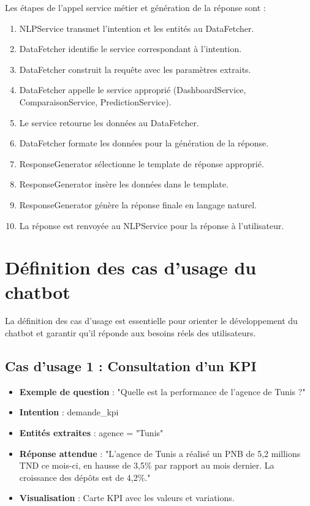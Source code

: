 Les étapes de l'appel service métier et génération de la réponse sont :

\begin{enumerate}
    \item NLPService transmet l'intention et les entités au DataFetcher.
    \item DataFetcher identifie le service correspondant à l'intention.
    \item DataFetcher construit la requête avec les paramètres extraits.
    \item DataFetcher appelle le service approprié (DashboardService, ComparaisonService, PredictionService).
    \item Le service retourne les données au DataFetcher.
    \item DataFetcher formate les données pour la génération de la réponse.
    \item ResponseGenerator sélectionne le template de réponse approprié.
    \item ResponseGenerator insère les données dans le template.
    \item ResponseGenerator génère la réponse finale en langage naturel.
    \item La réponse est renvoyée au NLPService pour la réponse à l'utilisateur.
\end{enumerate}

\section{Définition des cas d'usage du chatbot}
\label{sec:sprint6-use-cases}

La définition des cas d'usage est essentielle pour orienter le développement du chatbot et garantir qu'il réponde aux besoins réels des utilisateurs.

\subsection{Cas d'usage 1 : Consultation d'un KPI}

\begin{itemize}
    \item \textbf{Exemple de question} : "Quelle est la performance de l'agence de Tunis ?"
    \item \textbf{Intention} : demande\_kpi
    \item \textbf{Entités extraites} : agence = "Tunis"
    \item \textbf{Réponse attendue} : "L'agence de Tunis a réalisé un PNB de 5,2 millions TND ce mois-ci, en hausse de 3,5\% par rapport au mois dernier. La croissance des dépôts est de 4,2\%."
    \item \textbf{Visualisation} : Carte KPI avec les valeurs et variations.
\end{itemize}


